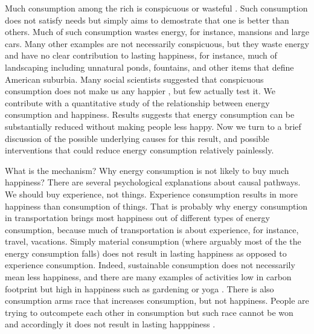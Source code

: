 \documentclass[10pt, letterpaper]{article}
\begin{document}
\begin{spacing}{1.4}
Much consumption among the rich is conspicuous or
wasteful \cite{veblen05a, veblen05b}. Such consumption does not satisfy needs
but simply aims to demostrate that
one is better than others. Much of such consumption  wastes energy, for
instance, mansions and large cars.  Many other examples are not necessarily conspicuous, 
but they waste energy and have no clear contribution to lasting happiness, for
instance, much of landscaping including unnatural ponds, fountains, and other items that
define American suburbia. Many social scientists suggested that conspicuous consumption
does not make us any happier  \cite{csikszentmihalyi99, frank04, frank05, frank12}, but few actually test it. We contribute with a quantitative study of
the relationship between energy consumption and happiness. %
 Results suggests that  energy consumption can be substantially reduced
without making people less happy.  Now we turn to a brief  discussion of the possible underlying causes for
this result, and  possible interventions that could reduce energy consumption
 relatively painlessly. 

What is the mechanism? Why energy consumption is not likely to buy much
happiness?  There are several psychological explanations about causal pathways.
We should buy experience, not things. Experience consumption results in more
happiness than consumption of things. 
That is  probably why  energy
consumption in transportation brings most happiness out of different types of
energy consumption, because much of
transportation is about experience, for instance, travel, vacations. 
Simply material consumption (where arguably most of the  the energy consumption
falls) does not result in lasting happiness as opposed to experience
consumption. Indeed, sustainable consumption does not necessarily mean less
happiness, and there are many examples of activities low in carbon footprint but
high in happiness such as gardening or yoga \cite{madjar06}. There is also
consumption arms race that increases consumption, but not happiness. People are trying to outcompete each other in
consumption but such race cannot be won and accordingly it does not result in lasting
happpiness \cite{frank12}.%



\end{spacing}
\end{document}
